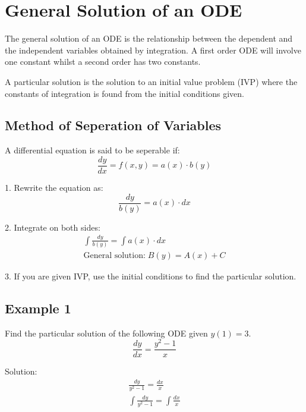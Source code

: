 \documentclass{article}
\begin{document}
\section{General Solution of an ODE}
The general solution of an ODE is the relationship between the dependent
and the independent variables obtained by integration. A first order
ODE will involve one constant whilst a second order has two constants.

A particular solution is the solution to an initial value problem (IVP)
where the constants of integration is found from the initial conditions
given.

\subsection{Method of Seperation of Variables}
A differential equation is said to be seperable if:
\begin{equation*}
  \frac{dy}{dx} = f(x , y) = a(x) \cdot b(y)
\end{equation*}

1. Rewrite the equation as:
\begin{equation*}
  \frac{dy}{b(y)} = a(x) \cdot dx
\end{equation*}

2. Integrate on both sides:
\begin{gather*}
  \int \frac{dy}{b(y)} = \int a(x) \cdot dx \\[5pt]
  \text{General solution:} \;B(y) = A(x) + C
\end{gather*}

\vspace{1ex}

3. If you are given IVP, use the initial conditions to find the particular
solution.

\subsection{Example 1}
Find the particular solution of the following ODE given $y(1) = 3$.
\begin{equation*}
  \frac{dy}{dx} = \frac{y^2 - 1}{x}
\end{equation*}

Solution:
\begin{gather*}
  \frac{dy}{y^2 - 1} = \frac{dx}{x} \\[5pt]
  \int \frac{dy}{y^2 - 1} = \int \frac{dx}{x}
\end{gather*}
\end{document}
